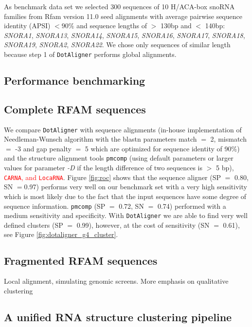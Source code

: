 \documentclass[a4paper,twoside]{article}
\newcommand\dotaligner{\texttt{DotAligner}}
\newcommand\pmcomp{\texttt{pmcomp}}
\newcommand\locarna{\texttt{LocaRNA}}
\newcommand\carna{\texttt{CARNA}}
\newcommand{\RED}[1]{\textcolor{red}{#1}}
\newcommand{\GRAY}[1]{\textcolor{mygray}{#1}}
\begin{document}
\GRAY{As benchmark data set we selected 300 sequences of 10 H/ACA-box snoRNA families
from Rfam version 11.0 seed alignments with average pairwise sequence identity
(APSI) $< 90\%$ and sequence lengths of $>$ 130bp and $<$ 140bp: \emph{SNORA1},
\emph{SNORA13}, \emph{SNORA14}, \emph{SNORA15}, \emph{SNORA16}, \emph{SNORA17},
\emph{SNORA18}, \emph{SNORA19}, \emph{SNORA2}, \emph{SNORA22}. We chose only
sequences of similar length because step 1 of \dotaligner{} performs global
alignments.}


\subsection{Performance benchmarking} 




\subsection{Complete RFAM sequences}

\GRAY{We compare \dotaligner{} with sequence alignments (in-house
implementation of Needleman-Wunsch algorithm with the blastn parameters match
$=$ 2, mismatch $=$ -3 and gap penalty $=$ 5 which are optimized for sequence
identity of 90\%) and the structure alignment tools \pmcomp{} (using default
parameters or larger values for parameter \emph{-D} if the length difference of
two sequences is $>$ 5 bp), \RED{\carna, and \locarna}. Figure \ref{fig:roc}
shows that the sequence aligner (SP $=$ 0.80, SN $=$0.97) performs very well on
our benchmark set with a very high sensitivity which is most likely due to the
fact that the input sequences have some degree of sequence information.
\pmcomp{} (SP $=$ 0.72, SN $=$ 0.74) performed with a medium sensitivity and
specificity. With \dotaligner{} we are able to find very well defined clusters (SP
$=$ 0.99), however, at the cost of sensitivity (SN $=$ 0.61), see Figure
\ref{fig:dotaligner_g4_cluster}.}




\subsection{Fragmented RFAM sequences} 

Local alignment, simulating genomic screens. More emphasis on qualitative clustering


\subsection{ A unified RNA structure clustering pipeline }
\end{document}
